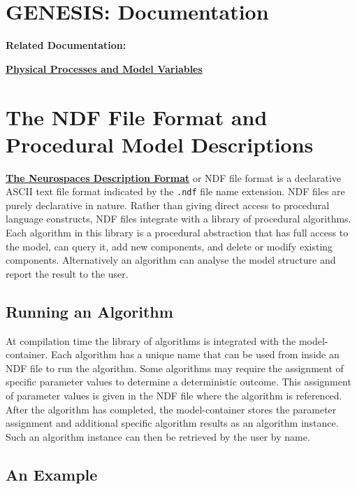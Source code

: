\documentclass[12pt]{article}
\begin{document}
\section*{GENESIS: Documentation}

{\bf Related Documentation:}

\href{../model-variables/model-variables.tex}{\bf Physical Processes and Model Variables}


\section*{The NDF File Format and Procedural Model Descriptions}

\href{../ndf-file-format/ndf-file-format.tex}{\bf The Neurospaces
  Description Format} or NDF file format is a declarative ASCII text
file format indicated by the {\tt .ndf} file name extension. NDF files
are purely declarative in nature.  Rather than giving direct access to
procedural language constructs, NDF files integrate with a library of
procedural algorithms.  Each algorithm in this library is a procedural
abstraction that has full access to the model, can query it, add new
components, and delete or modify existing components.  Alternatively
an algorithm can analyse the model structure and report the result to
the user.


\subsection*{Running an Algorithm}
\label{sec:running-an-algorithm}

At compilation time the library of algorithms is integrated with the
model-container.  Each algorithm has a unique name that can be used
from inside an NDF file to run the algorithm.  Some algorithms may
require the assignment of specific parameter values to determine a
deterministic outcome.  This assignment of parameter values is given
in the NDF file where the algorithm is referenced.  After the
algorithm has completed, the model-container stores the parameter
assignment and additional specific algorithm results as an algorithm
instance.  Such an algorithm instance can then be retrieved by the
user by name.


\subsection*{An Example}
\label{sec:an-example}
\end{document}
